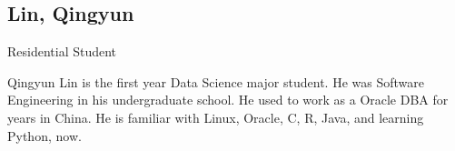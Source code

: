 \subsection{Lin, Qingyun}

Residential Student
		
Qingyun Lin is the first year Data Science major student. He was Software Engineering in his undergraduate school. 
He used to work as a Oracle DBA for years in China. 
He is familiar with Linux, Oracle, C, R, Java, and learning Python, now.

